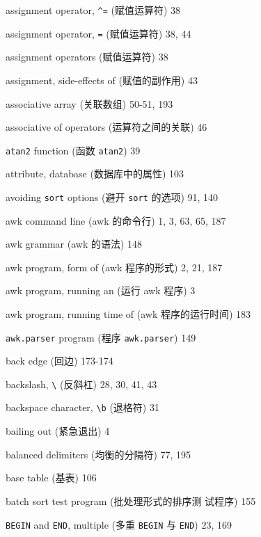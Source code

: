 \begin{multicols}{2}
\hangindent=2pc  assignment operator, \verb'^=' (赋值运算符) 38

\hangindent=2pc  assignment operator, \verb'=' (赋值运算符) 38, 44

\hangindent=2pc  assignment operators (赋值运算符) 38

\hangindent=2pc  assignment, side-effects of (赋值的副作用) 43

\hangindent=2pc  associative array (关联数组) 50-51, 193

\hangindent=2pc  associative of operators (运算符之间的关联) 46

\hangindent=2pc  \verb'atan2' function (函数 \verb'atan2') 39

\hangindent=2pc  attribute, database (数据库中的属性) 103

\hangindent=2pc  avoiding \verb'sort' options (避开 \verb'sort'
的选项) 91, 140

\hangindent=2pc  awk command line (awk 的命令行) 1, 3, 63, 65, 187

\hangindent=2pc  awk grammar (awk 的语法) 148

\hangindent=2pc  awk program, form of (awk 程序的形式) 2, 21, 187

\hangindent=2pc  awk program, running an (运行 awk 程序) 3

\hangindent=2pc  awk program, running time of (awk
程序的运行时间) 183

\hangindent=2pc  \verb'awk.parser' program (程序
\verb'awk.parser') 149

\hangindent=2pc  back edge (回边) 173-174

\hangindent=2pc  backslash, \verb'\' (反斜杠) 28, 30, 41, 43

\hangindent=2pc  backspace character, \verb'\b' (退格符) 31

\hangindent=2pc  bailing out (紧急退出) 4

\hangindent=2pc  balanced delimiters (均衡的分隔符) 77, 195

\hangindent=2pc  base table (基表) 106

\hangindent=2pc  batch sort test program (批处理形式的排序测
试程序) 155

\hangindent=2pc  \verb'BEGIN' and \verb'END', multiple (多重
\verb'BEGIN' 与 \verb'END') 23, 169


\end{multicols}
